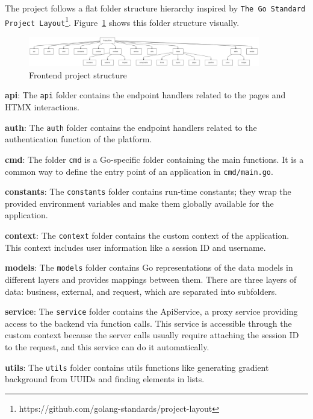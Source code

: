The project follows a flat folder structure hierarchy inspired by \texttt{The Go Standard Project Layout}\footnote{https://github.com/golang-standards/project-layout}. Figure~\ref{fig:frontend-project-structure} shows this folder structure visually.

\begin{figure}[H]
    \centering
    \includegraphics[width=0.9\textwidth, keepaspectratio]{figures/frontend-project-structure.png}
    \caption{Frontend project structure}
    \label{fig:frontend-project-structure}
\end{figure}

\textbf{api}: The \texttt{api} folder contains the endpoint handlers related to the pages and HTMX interactions.

\textbf{auth}: The \texttt{auth} folder contains the endpoint handlers related to the authentication function of the platform.

\textbf{cmd}: The folder \texttt{cmd} is a Go-specific folder containing the main functions. It is a common way to define the entry point of an application in \texttt{cmd/main.go}.

\textbf{constants}: The \texttt{constants} folder contains run-time constants; they wrap the provided environment variables and make them globally available for the application.

\textbf{context}: The \texttt{context} folder contains the custom context of the application. This context includes user information like a session ID and username.

\textbf{models}: The \texttt{models} folder contains Go representations of the data models in different layers and provides mappings between them. There are three layers of data: business, external, and request, which are separated into subfolders.

\textbf{service}: The \texttt{service} folder contains the ApiService, a proxy service providing access to the backend via function calls. This service is accessible through the custom context because the server calls usually require attaching the session ID to the request, and this service can do it automatically.

\textbf{utils}: The \texttt{utils} folder contains utils functions like generating gradient background from UUIDs and finding elements in lists.

